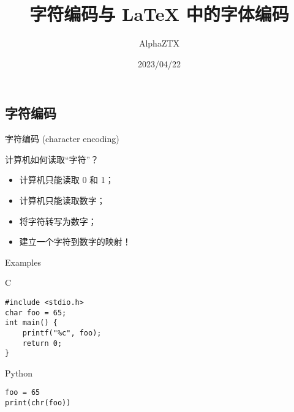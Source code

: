 \documentclass{beamer}
\title{字符编码与 \LaTeX{} 中的字体编码}
\author{AlphaZTX}
\date{2023/04/22}
\begin{document}
\maketitle

\begin{frame}
\section{字符编码}
\end{frame}

\begin{frame}{字符编码 (character encoding)}
\begin{exampleblock}{计算机如何读取“字符”？}
\begin{itemize}%
\item 计算机只能读取 0 和 1；
\item 计算机只能读取数字；
\item 将字符转写为数字；%
\item 建立一个字符到数字的映射！
\end{itemize}
\end{exampleblock}
\end{frame}

\begin{frame}[fragile]{Examples}
\begin{exampleblock}{C}
\begin{verbatim}
#include <stdio.h>
char foo = 65;
int main() {
    printf("%c", foo);
    return 0;
}
\end{verbatim}
\end{exampleblock}
\begin{exampleblock}{Python}
\begin{verbatim}
foo = 65
print(chr(foo))
\end{verbatim}
\end{exampleblock}
\end{frame}
\end{document}
